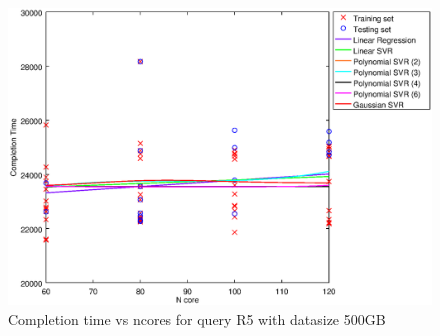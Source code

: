 
\begin {figure}[hbtp]
\centering
\includegraphics[width=\textwidth]{output/R5_500_ONLY_1_LINEAR_NCORE/plot_R5_500.eps}
\caption{Completion time vs ncores for query R5 with datasize 500GB}
\label{fig:only_1_linear_R5_500}
\end {figure}
